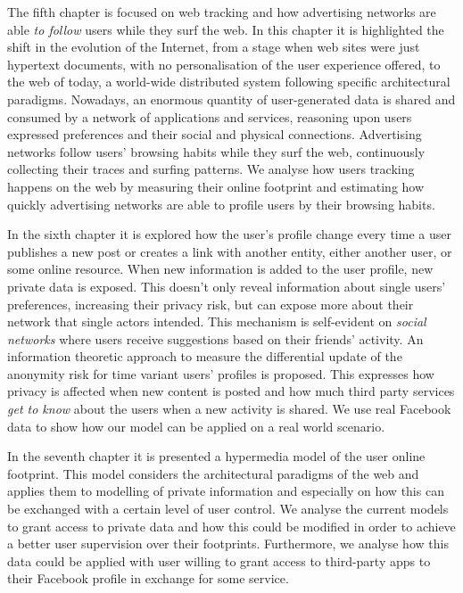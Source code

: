 The fifth chapter is focused on web tracking and how advertising networks are able \emph{to follow} users while they surf the web. In this chapter it is highlighted the shift in the evolution of the Internet, from a stage when web sites were just hypertext documents, with no personalisation of the user experience offered, to the web of today, a world-wide distributed system following specific architectural paradigms. Nowadays, an enormous quantity of user-generated data is shared and consumed by a network of applications and services, reasoning upon users expressed preferences and their social and physical connections. Advertising networks follow users’ browsing habits while they surf the web, continuously collecting their traces and surfing patterns. We analyse how users tracking happens on the web by measuring their online footprint and estimating how quickly advertising networks are able to profile users by their browsing habits.

In the sixth chapter it is explored how the user's profile change every time a user publishes a new post or creates a link with another entity, either another user, or some online resource. When new information is added to the user profile, new private data is exposed. This doesn't only reveal information about single users' preferences, increasing their privacy risk, but can expose more about their network that single actors intended. This mechanism is self-evident on \emph{social networks} where users receive suggestions based on their friends’ activity. An information theoretic approach to measure the differential update of the anonymity risk for time variant users’ profiles is proposed. This expresses how privacy is affected when new content is posted and how much third party services \emph{get to know} about the users when a new activity is shared. We use real Facebook data to show how our model can be applied on a real world scenario.

In the seventh chapter it is presented a hypermedia model of the user online footprint. This model considers the architectural paradigms of the web and applies them to modelling of private information and especially on how this can be exchanged with a certain level of user control. We analyse the current models to grant access to private data and how this could be modified in order to achieve a better user supervision over their footprints. Furthermore, we analyse how this data could be applied with user willing to grant access to third-party apps to their Facebook profile in exchange for some service.